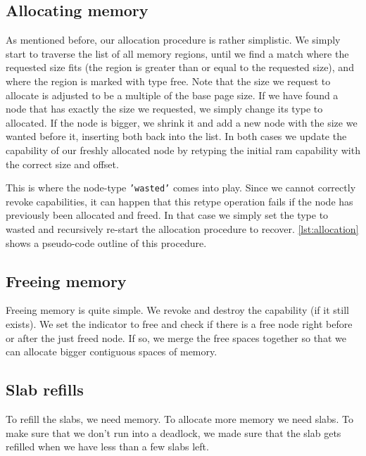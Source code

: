 \subsection{Allocating memory}\label{ss:alloc-mem}
As mentioned before, our allocation procedure is rather simplistic. We simply 
start to traverse the list of all memory regions, until we find a match where 
the requested size fits (the region is greater than or equal to the requested 
size), and where the region is marked with type free. Note that the size we 
request to allocate is adjusted to be a multiple of the base page size. If we 
have found a node that has exactly the size we requested, we simply change its 
type to allocated. If the node is bigger, we shrink it and add a new node with 
the size we wanted before it, inserting both back into the list. In both cases 
we update the capability of our freshly allocated node by retyping the initial 
ram capability with the correct size and offset.
\medskip

This is where the node-type \texttt{'wasted'} comes into play. Since we cannot 
correctly revoke capabilities, it can happen that this retype operation fails 
if the node has previously been allocated and freed. In that case we simply set 
the type to wasted and recursively re-start the allocation procedure to 
recover. \autoref{lst:allocation} shows a pseudo-code outline of this procedure.

\subsection{Freeing memory}\label{ss:free-mem}
Freeing memory is quite simple. We revoke and destroy the capability (if it
still exists). We set the indicator to free and check if there is a free node
right before or after the just freed node. If so, we merge the free spaces
together so that we can allocate bigger contiguous spaces of memory.

\subsection{Slab refills}\label{ss:slab-refills}
To refill the slabs, we need memory. To allocate more memory we need slabs. To
make sure that we don't run into a deadlock, we made sure that the slab gets
refilled when we have less than a few slabs left.
